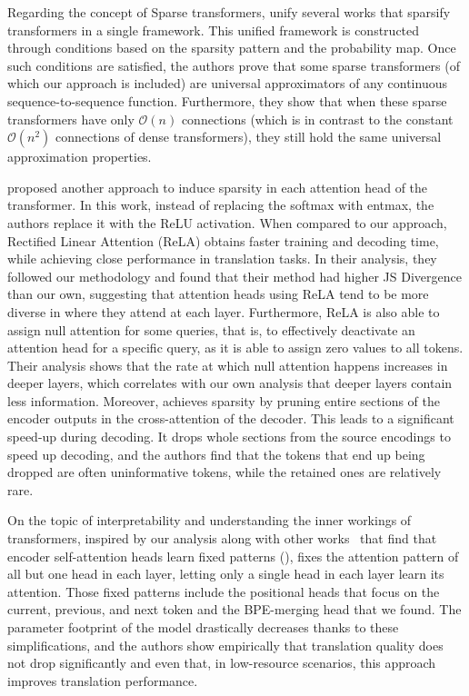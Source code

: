 Regarding the concept of Sparse transformers,
\citet{yun2020ConnectionsareExpressive} unify several works that
sparsify transformers in a single framework.
This unified framework is constructed through conditions based on the
sparsity pattern and the probability map. Once such conditions are
satisfied, the authors prove that some sparse transformers (of which
our approach is included) are universal approximators of any
continuous sequence-to-sequence function. Furthermore, they show that
when these sparse transformers have only $\mathcal{O}(n)$ connections (which is
in contrast to the constant $\mathcal{O}(n^2)$ connections of dense
transformers), they still hold the same universal approximation
properties.

\citet{zhang2021SparseAttentionLinear} proposed another approach to
induce sparsity in each attention head of the transformer. In this
work, instead of replacing the softmax with entmax, the authors
replace it with the ReLU activation. When compared to our approach,
Rectified Linear Attention (ReLA) obtains faster training and
decoding time, while achieving close performance in translation
tasks. In their analysis, they followed our methodology and found
that their method had higher JS Divergence than our own, suggesting
that attention heads using ReLA tend to be more diverse in where they
attend at each layer. Furthermore, ReLA is also able to assign null
attention for some queries, that is, to effectively deactivate an
attention head for a specific query, as it is able to assign zero
values to all tokens. Their analysis shows that the rate at which
null attention happens increases in deeper layers, which correlates
with our own analysis that deeper layers contain less information.
Moreover, \citet{zhang2021SparsifyingEncoderOutputs} achieves
sparsity by pruning entire sections of the encoder outputs in the
cross-attention of the decoder. This leads to a significant speed-up
during decoding. It drops whole sections from the source encodings to
speed up decoding, and the authors find that the tokens that end up
being dropped are often uninformative tokens, while the retained ones
are relatively rare.

On the topic of interpretability and understanding the inner workings
of transformers, inspired by our analysis along with other
works~\citep{specialized} that find that
encoder self-attention heads learn fixed patterns
(), \citet{raganato2020FixedEncoderSelfAttention}
fixes the attention pattern of all but one head in each layer,
letting only a single head in each layer learn its attention. Those
fixed patterns include the positional heads that focus on the
current, previous, and next token and the BPE-merging head that we
found. The parameter footprint of the model drastically decreases
thanks to these simplifications, and the authors show empirically
that translation quality does not drop significantly and even that,
in low-resource scenarios, this approach improves translation
performance.

